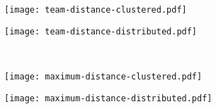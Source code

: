 \documentclass[11pt,a4paper]{article}
\begin{document}
\noindent
\begin{minipage}{0.5\textwidth}
\texttt{[image: team-distance-clustered.pdf]}
\end{minipage}
\begin{minipage}{0.5\textwidth}
\texttt{[image: team-distance-distributed.pdf]}
\end{minipage}
\\[0.5cm]

\noindent
\begin{minipage}{0.5\textwidth}
\texttt{[image: maximum-distance-clustered.pdf]}
\end{minipage}
\begin{minipage}{0.5\textwidth}
\texttt{[image: maximum-distance-distributed.pdf]}
\end{minipage}
\\[0.5cm]

\end{document}
